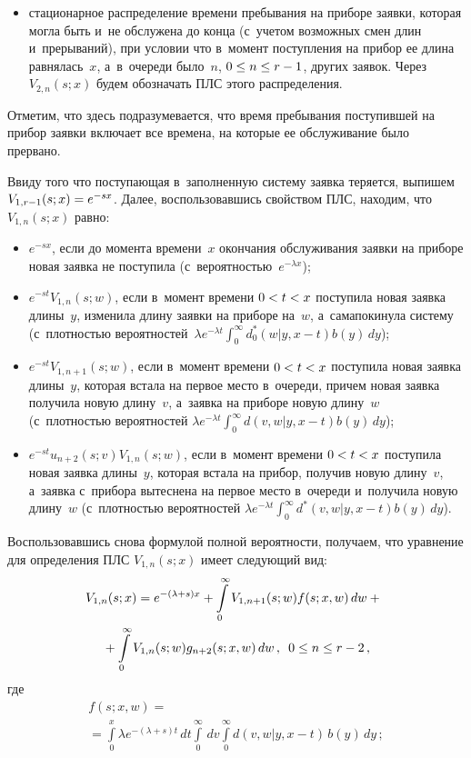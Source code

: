 \begin{multicols}{2}
\begin{itemize}
\item стационарное распределение времени пребывания на приборе заявки,
которая могла быть и~не обслужена до конца (с~учетом возможных смен длин
и~прерываний), при условии что в~момент поступления на прибор
ее длина равнялась~$x$, а~в~очереди было~$n$, $0\hm\le n\hm\le r-1$, других заявок.
Через $V_{2,n}(s;x)$ будем обозначать ПЛС этого распределения.
\end{itemize}

Отметим, что здесь подразумевается, что время пребывания поступившей
на прибор заявки включает все времена,
на которые ее обслуживание было прервано.

Ввиду того что поступающая в~заполненную сис\-те\-му заявка теряется, выпишем
$ V_{1,r-1}(s;x)\hm=e^{-s x}$.
Далее, воспользовавшись свойством ПЛС, находим, что $V_{1,n}(s;x)$  равно:
\begin{itemize}
\item  $e^{-s x}$, если до момента времени~$x$
окончания обслуживания заявки на приборе
новая заявка не поступила (с~вероятностью~$e^{-\lambda x}$);
\item  $e^{-s t}V_{1,n}(s;w)$, если в~момент времени
$0\hm<t\hm<x$ поступила новая заявка длины~$y$,
изменила длину заявки на приборе на~$w$, а~сама\linebreak покинула систему 
(с~плотностью вероятностей~$\lambda e^{-\lambda t}
\int\nolimits_0^\infty d^*_0(w|y,x-t) b(y)\, dy$);

\item $e^{-s t}V_{1,n+1}(s;w)$, если в~момент
времени $0\hm<t\hm<x$ поступила новая заявка длины~$y$, которая
встала на первое место в~очереди, причем новая заявка
получила новую длину~$v$, а~заявка на приборе новую
длину~$w$ (с~плотностью вероятностей
$\lambda e^{-\lambda t} \int\nolimits_0^\infty d(v,w|y,x-t) b(y)\, dy$);

\item  $e^{-s t}u_{n+2}(s;v)V_{1,n}(s;w)$, если в~момент
времени $0\hm<t\hm<x$ поступила новая заявка длины~$y$, которая встала на 
прибор, получив \mbox{новую} длину~$v$, а~заявка с~прибора вытеснена на первое место 
в~очереди и~получила новую длину~$w$ (с~плотностью вероятностей
$\lambda e^{-\lambda t} \int\nolimits_0^\infty
d^*(v,w|y,x-t) b(y)\, dy $).
\end{itemize}

Воспользовавшись снова формулой полной вероятности, получаем, что
уравнение для определения ПЛС $V_{1,n}(s;x)$ имеет следующий вид:
\begin{multline*}
\!\!V_{1,n}(s;x)= e^{-(\lambda+s)x} +\int\limits_0^\infty 
V_{1,n+1}(s;w) f(s;x,w) \, dw
+{}\\
{}+\int\limits_0^\infty V_{1,n}(s;w) g_{n+2}(s;x,w) \, dw\,, \enskip 0\le n\le r-2\,,
\end{multline*}
где
\begin{multline*}
f(s;x,w)= {}\\
{}=\int\limits_0^x \lambda e^{-(\lambda+s) t}\,dt \int\limits_0^\infty  \, dv
\int\limits_0^\infty d(v,w|y,x-t)\, b(y)\, dy\,; 
\end{multline*}


\end{multicols}

